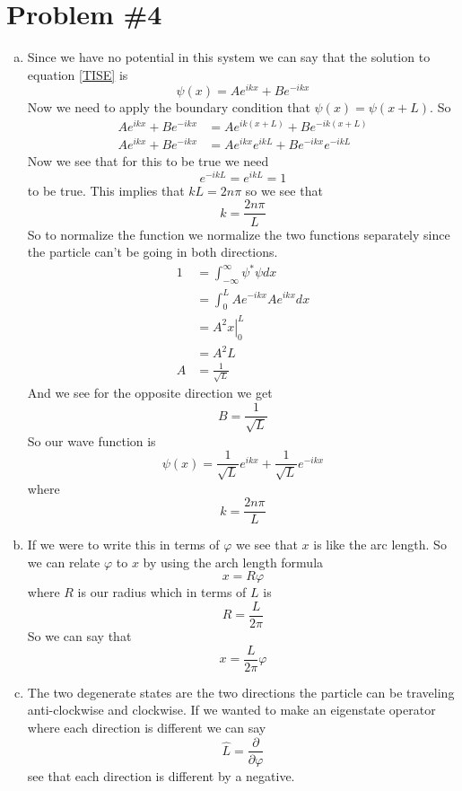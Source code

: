 \documentclass[11pt]{article}
\numberwithin{equation}{section}
\begin{document}
\section{Problem \#4}
\begin{enumerate}[(a)]
\item
Since we have no potential in this system we can say that the solution to equation \ref{TISE} is
$$\psi(x) = Ae^{ikx}+Be^{-ikx}$$
Now we need to apply the boundary condition that $\psi(x) = \psi(x+L)$. So
\begin{align*}
Ae^{ikx}+Be^{-ikx} &= Ae^{ik(x+L)}+Be^{-ik(x+L)} \\ 
Ae^{ikx}+Be^{-ikx} &= Ae^{ikx}e^{ikL}+Be^{-ikx}e^{-ikL}
\end{align*}
Now we see that for this to be true we need
$$e^{-ikL} = e^{ikL} = 1$$
to be true. This implies that $kL = 2n\pi$ so we see that 
$$k = \frac{2n\pi}{L}$$
So to normalize the function we normalize the two functions separately since the particle can't be going in both directions.
\begin{align*}
1 &= \int_{-\infty}^{\infty} \psi^*\psi dx\\
&= \int_{0}^{L}Ae^{-ikx}Ae^{ikx}dx\\
&= \left.A^2x\right|_0^L\\
&= A^2L\\
A &= \frac{1}{\sqrt{L}}
\end{align*}
And we see for the opposite direction we get
$$B = \frac{1}{\sqrt{L}}$$
So our wave function is
$$\psi(x) = \frac{1}{\sqrt{L}}e^{ikx}+\frac{1}{\sqrt{L}}e^{-ikx}$$
where 
$$k = \frac{2n\pi}{L}$$

\item
If we were to write this in terms of $\varphi$ we see that $x$ is like the arc length. So we can relate $\varphi$ to $x$ by using the arch length formula
$$x = R\varphi$$
where $R$ is our radius which in terms of $L$ is 
$$R = \frac{L}{2\pi}$$
So we can say that
$$x = \frac{L}{2\pi}\varphi$$

\item
The two degenerate states are the two directions the particle can be traveling anti-clockwise and clockwise. If we wanted to make an eigenstate operator where each direction is different we can say 
$$\hat{L} = \frac{\partial}{\partial\varphi}$$
see that each direction is different by a negative.
\end{enumerate}
\end{document}
